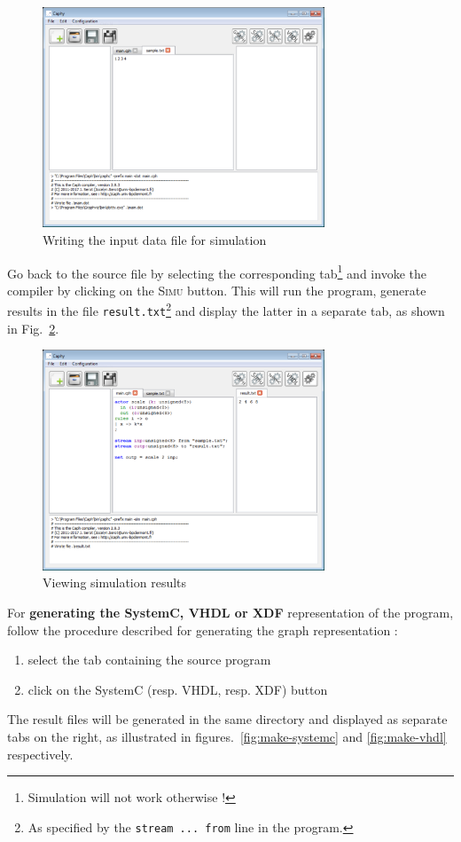 \begin{figure}[h]
  \centering
  \includegraphics[width=0.75\textwidth]{figs/ide/write-sample}
  \caption{Writing the input data file for simulation}
  \label{fig:write-sample}
\end{figure}

Go back to the \caph source file by selecting the corresponding tab\footnote{Simulation will not
  work otherwise !}  and invoke the compiler by clicking on the \textsc{Simu} button. This will run
the program, generate results in the file \texttt{result.txt}\footnote{As specified by the
  \texttt{stream ... from} line in the program.} and display the latter in a separate tab, as shown
in Fig.~\ref{fig:make-sim}.

\begin{figure}[h]
  \centering
  \includegraphics[width=0.75\textwidth]{figs/ide/make-sim}
  \caption{Viewing simulation results}
  \label{fig:make-sim}
\end{figure}

\medskip
For \textbf{generating the SystemC, VHDL or XDF} representation of the program, follow the procedure
described for generating the graph representation :
\begin{enumerate}
\item select the tab containing the source program
\item click on the \textsf{SystemC} (resp. \textsf{VHDL}, resp. \textsf{XDF}) button
\end{enumerate}
The result files will be generated in the same directory and displayed as separate tabs on the
right, as illustrated in figures.~\ref{fig:make-systemc} and \ref{fig:make-vhdl} respectively.

